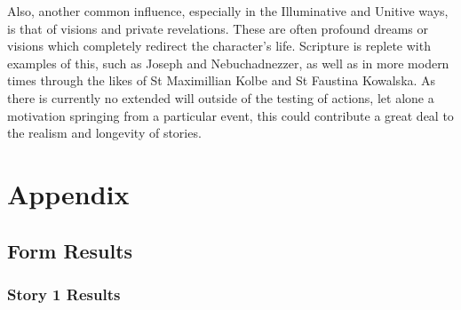 \documentclass[12pt]{article}
\begin{document}
Also, another common influence, especially in the Illuminative and Unitive ways, is that of visions and private revelations. These are often profound dreams or visions which completely redirect the character's life. Scripture is replete with examples of this, such as Joseph and Nebuchadnezzer, as well as in more modern times through the likes of St Maximillian Kolbe and St Faustina Kowalska. As there is currently no extended will outside of the testing of actions, let alone a motivation springing from a particular event, this could contribute a great deal to the realism and longevity of stories.  \\


\printbibliography
{}
\section{Appendix}

\subsection{Form Results}

\subsubsection{Story 1 Results}
\begin{table}[h]
\caption{Story 1 General Results}
\label{tab:Story1Res}
\end{table}
\end{document}

